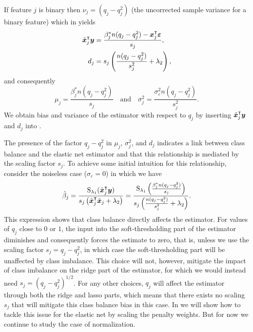 If feature $j$ is binary then \(\nu_j = (q_j - q_j^2)\) (the uncorrected sample variance
for a binary feature) which in  yields
\begin{align*}
  \tilde{\bm{x}}_j^\intercal \bm{y} & = \frac{\beta_j^* n(q_j - q_j^2) - \bm{x}_j^\intercal \bm{\varepsilon}}{s_j}, \\
  d_j                          & = s_j \left(\frac{n(q_j - q_j^2)}{s_j^2} + \lambda_2\right),
\end{align*}
and consequently
\[
  \mu_j = \frac{\beta^*_j n(q_j - q_j^2)}{s_j}\quad \text{and} \quad \sigma_j^2 = \frac{\sigma_\varepsilon^2n(q_j- q_j^2)}{s^2_j}.
\]
%
We obtain bias and variance of the estimator with respect to \(q_j\) by inserting
\(\tilde{\bm{x}}_j^\intercal \bm{y}\) and \(d_j\) into .

The presence of the factor \(q_j - q_j^2\) in \(\mu_j\), \(\sigma_j^2\), and \(d_j\)
indicates a link between class balance and the elastic net estimator and that this
relationship is mediated by the scaling factor \(s_j\). To achieve some initial intuition
for this relationship, consider the noiseless case (\(\sigma_\varepsilon = 0\)) in which we
have
\begin{equation}
  \label{eq:noiseless-estimator}
  \hat{\beta}_j = \frac{\operatorname{S}_{\lambda_1}(\tilde{\bm{x}}_j^\intercal \bm{y})}{s_j\left(\tilde{\bm{x}}_j^\intercal \tilde{\bm{x}}_j + \lambda_2\right)}
  =
  \frac{\operatorname{S}_{\lambda_1}\left(\frac{\beta_j^* n (q_j - q_j^2)}{s_j}\right)}{s_j\left(\frac{n(q_j - q_j^2)}{s_j^2} + \lambda_2\right)}.
\end{equation}
%
This expression shows that class balance directly affects the estimator. For values of
\(q_j\) close to \(0\) or \(1\), the input into the soft-thresholding part of the estimator
diminishes and consequently forces the estimate to zero, that is, unless we use the scaling
factor \(s_j = q_j - q_j^2\), in which case the soft-thresholding part will be unaffected
by class imbalance. This choice will not, however, mitigate the impact of class imbalance
on the ridge part of the estimator, for which we would instead need \(s_j = (q_j -
q_j^2)^{1/2}\). For any other choices, \(q_j\) will affect the estimator through both the
ridge and lasso parts, which means that there exists no scaling \(s_j\) that will mitigate
this class balance bias in this case. In  we will show how to
tackle this issue for the elastic net by scaling the penalty weights. But for now we
continue to study the case of normalization.

